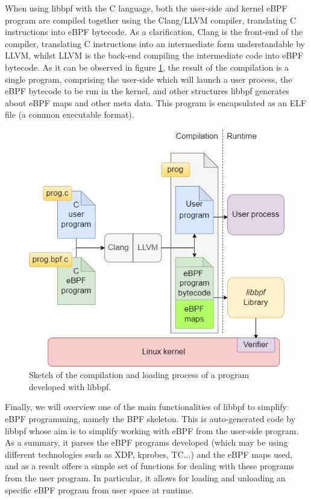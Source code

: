 \documentclass[12pt]{report} %
\begin{document}
When using libbpf with the C language, both the user-side and kernel eBPF program are compiled together using the Clang/LLVM compiler, translating C instructions into eBPF bytecode. As a clarification, Clang is the front-end of the compiler, translating C instructions into an intermediate form understandable by LLVM, whilst LLVM is the back-end compiling the intermediate code into eBPF bytecode. As it can be observed in figure \ref{fig:libbpf}, the result of the compilation is a single program, comprising the user-side which will launch a user process, the eBPF bytecode to be run in the kernel, and other structures libbpf generates about eBPF maps and other meta data. This program is encapsulated as an ELF file (a common executable format).

\begin{figure}[H]
	\centering
	\includegraphics[width=12cm, keepaspectratio=true]{libbpf_prog.jpg}
	\caption{Sketch of the compilation and loading process of a program developed with libbpf.}
	\label{fig:libbpf}
\end{figure}

Finally, we will overview one of the main functionalities of libbpf to simplify eBPF programming, namely the BPF skeleton. This is auto-generated code by libbpf whose aim is to simplify working with eBPF from the user-side program. As a summary, it parses the eBPF programs developed (which may be using different technologies such as XDP, kprobes, TC...) and the eBPF maps used, and as a result offers a simple set of functions for dealing with these programs from the user program. In particular, it allows for loading and unloading an specific eBPF program from user space at runtime.
\end{document}

